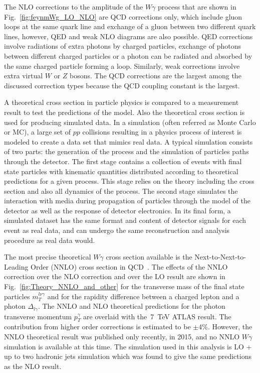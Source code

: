 The NLO corrections to the amplitude of the $W\gamma$ process that are shown in Fig.~\ref{fig:feynmWg_LO_NLO} are QCD corrections only, which include gluon loops at the same quark line and exchange of a gluon between two different quark lines, however, QED and weak NLO diagrams are also possible. QED corrections involve radiations of extra photons by charged particles, exchange of photons between different charged particles or a photon can be radiated and absorbed by the same charged particle forming a loop. Similarly, weak corrections involve extra virtual $W$ or $Z$ bosons. The QCD corrections are the largest among the discussed correction types because the QCD coupling constant is the largest.

A theoretical cross section in particle physics is compared to a measurement result to test the predictions of the model. Also the theoretical cross section is used for producing simulated data. In a simulation (often referred as Monte Carlo or MC), a large set of $pp$ collisions resulting in a physics process of interest is modeled to create a data set that mimics real data. A typical simulation consists of two parts: the generation of the process and the simulation of particles paths through the detector. The first stage contains a collection of events with final state particles with kinematic quantities distributed according to theoretical predictions for a given process. This stage relies on the theory including the cross section and also all dynamics of the process. The second stage simulates the interaction with media during propagation of particles through the model of the detector as well as the response of detector electronics. In its final form, a simulated dataset has the same format and content of detector signals for each event as real data, and can undergo the same reconstruction and analysis procedure as real data would.

The most precise theoretical $W\gamma$ cross section available is the Next-to-Next-to-Leading Order (NNLO) cross section in QCD~\cite{ref_theory_NNLO}. The effects of the NNLO correction over the NLO correction and over the LO result are shown in Fig.~\ref{fig:Theory_NNLO_and_other} for the transverse mass of the final state particles $m_T^{l \nu \gamma}$ and for the rapidity difference between a charged lepton and a photon $\Delta_{l\gamma}$. The NNLO and NLO theoretical predictions for the photon transverse momentum $p_T^\gamma$ are overlaid with the~7~TeV ATLAS result. The contribution from higher order corrections is estimated to be $\pm$4\%. However, the NNLO theoretical result was published only recently, in 2015, and no NNLO $W\gamma$ simulation is available at this time. The simulation used in this analysis is LO + up to two hadronic jets simulation which was found to give the same predictions as the NLO result.

